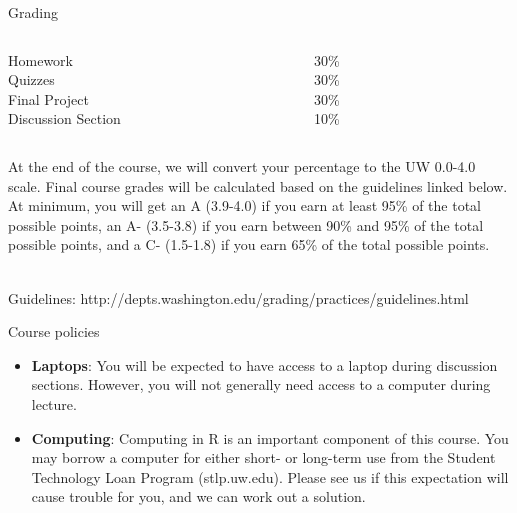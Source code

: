 \documentclass[10pt,t]{beamer}
\begin{document}
\begin{frame}{Grading}
\begin{columns}
	\begin{column}[t]{0.4\textwidth}
		Homework \\
		Quizzes \\
		Final Project \\
		Discussion Section 
	\end{column}
	\begin{column}[t]{0.4\textwidth}  %
		30\% \\
		30\% \\
		30\% \\
		10\% 
	\end{column}
\end{columns}

\vspace{1cm}

At the end of the course, we will convert your percentage to the UW 0.0-4.0 scale. Final course grades will be calculated based on the guidelines linked below. At minimum, you will get an A (3.9-4.0) if you earn at least 95\% of the total possible points, an A- (3.5-3.8) if you earn between 90\% and 95\% of the total possible points, and a C- (1.5-1.8) if you earn 65\% of the total possible points. \\~\

Guidelines: http://depts.washington.edu/grading/practices/guidelines.html 

\end{frame}

\begin{frame}{Course policies}
\begin{itemize}
	\item \textbf{Laptops}: You will be expected to have access to a laptop during discussion sections. However, you will not generally need access to a computer during lecture.
	
	\item \textbf{Computing}: Computing in R is an important component of this course. You may borrow a computer for either short- or long-term use from the Student Technology Loan Program (stlp.uw.edu). Please see us if this expectation will cause trouble for you, and we can work out a solution.
\end{itemize}
\end{frame}
\end{document}
